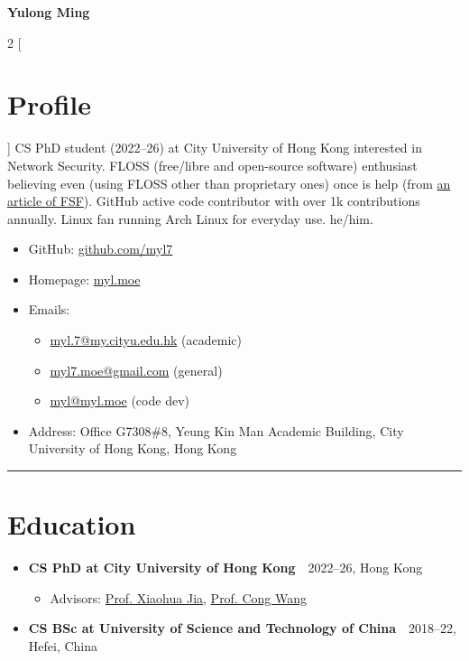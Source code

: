 \documentclass{article}
\begin{document}
\begin{center}
  {\huge \textbf{Yulong Ming}}
\end{center}

\begin{multicols}{2}
  [\section*{Profile}]
  CS PhD student (2022--26) at City University of Hong Kong interested in Network Security.
  FLOSS (free/libre and open-source software) enthusiast believing even (using FLOSS other than proprietary ones) once is help (from \href{https://www.gnu.org/philosophy/saying-no-even-once.html}{an article of FSF}).
  GitHub active code contributor with over 1k contributions annually.
  Linux fan running Arch Linux for everyday use.
  he/him.

  \begin{itemize}[itemsep=0cm,parsep=0cm]
    \item GitHub: \href{https://github.com/myl7}{github.com/myl7}
    \item Homepage: \href{https://myl.moe}{myl.moe}
    \item Emails:
    \begin{itemize}[itemsep=0cm,parsep=0cm,topsep=0cm,leftmargin=0.25cm,label=]
      \item \href{mailto:myl.7@my.cityu.edu.hk}{myl.7@my.cityu.edu.hk} (academic)
      \item \href{mailto:myl7.moe@gmail.com}{myl7.moe@gmail.com} (general)
      \item \href{mailto:myl@myl.moe}{myl@myl.moe} (code dev)
    \end{itemize}
    \item Address: Office G7308\#8, Yeung Kin Man Academic Building, City University of Hong Kong, Hong Kong
  \end{itemize}
\end{multicols}

\hrule

\section*{Education}
\begin{itemize}[parsep=0.1cm,leftmargin=0.4cm]
  \item \textbf{CS PhD at City University of Hong Kong}\ \dotfill\ 2022--26, Hong Kong
  \begin{itemize}[itemsep=0cm,parsep=0cm,topsep=0cm,leftmargin=0.25cm,label=]
    \item Advisors: \href{https://www.cs.cityu.edu.hk/~jia/}{Prof. Xiaohua Jia}, \href{https://www.cs.cityu.edu.hk/~congwang/}{Prof. Cong Wang}
  \end{itemize}
  \item \textbf{CS BSc at University of Science and Technology of China}\ \dotfill\ 2018--22, Hefei, China
\end{itemize}
\end{document}

